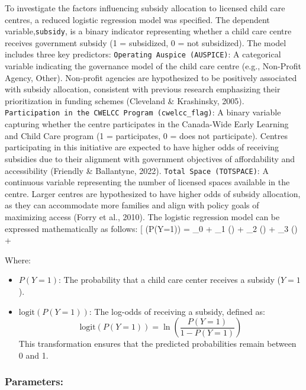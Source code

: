 \documentclass[
  letterpaper,
  DIV=11,
  numbers=noendperiod]{scrartcl}
\begin{document}
To investigate the factors influencing subsidy allocation to licensed
child care centres, a reduced logistic regression model was specified.
The dependent variable,\texttt{subsidy}, is a binary indicator
representing whether a child care centre receives government subsidy (1
= subsidized, 0 = not subsidized). The model includes three key
predictors: \texttt{Operating\ Auspice\ (AUSPICE)}: A categorical
variable indicating the governance model of the child care centre (e.g.,
Non-Profit Agency, Other). Non-profit agencies are hypothesized to be
positively associated with subsidy allocation, consistent with previous
research emphasizing their prioritization in funding schemes (Cleveland
\& Krashinsky, 2005).
\texttt{Participation\ in\ the\ CWELCC\ Program\ (cwelcc\_flag)}: A
binary variable capturing whether the centre participates in the
Canada-Wide Early Learning and Child Care program (1 = participates, 0 =
does not participate). Centres participating in this initiative are
expected to have higher odds of receiving subsidies due to their
alignment with government objectives of affordability and accessibility
(Friendly \& Ballantyne, 2022). \texttt{Total\ Space\ (TOTSPACE)}: A
continuous variable representing the number of licensed spaces available
in the centre. Larger centres are hypothesized to have higher odds of
subsidy allocation, as they can accommodate more families and align with
policy goals of maximizing access (Forry et al., 2010). The logistic
regression model can be expressed mathematically as follows: {[}
(P(Y=1)) = \beta\_0 + \beta\_1 () +
\beta\_2 () + \beta\_3 () +
\epsilon {]}

Where:

\begin{itemize}
    \item \( P(Y=1) \): The probability that a child care center receives a subsidy (\( Y=1 \)).
    \item \( \text{logit}(P(Y=1)) \): The log-odds of receiving a subsidy, defined as:
    \[
    \text{logit}(P(Y=1)) = \ln\left(\frac{P(Y=1)}{1 - P(Y=1)}\right)
    \]
    This transformation ensures that the predicted probabilities remain between 0 and 1.
\end{itemize}

\subsubsection{Parameters:}\label{parameters}
\end{document}
